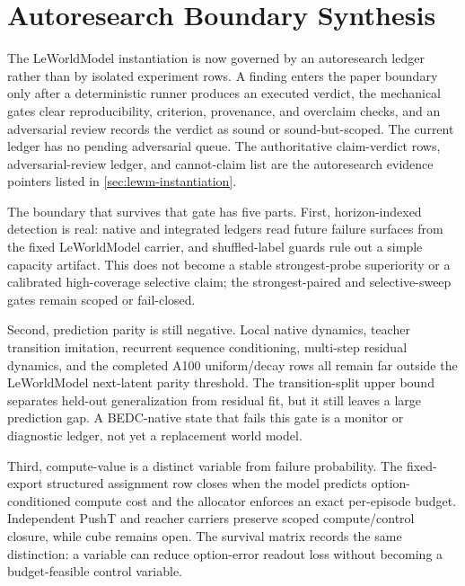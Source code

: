 \section{Autoresearch Boundary Synthesis}
\label{sec:autoresearch-boundary-synthesis}

The LeWorldModel instantiation is now governed by an autoresearch ledger rather
than by isolated experiment rows.  A finding enters the paper boundary only
after a deterministic runner produces an executed verdict, the mechanical gates
clear reproducibility, criterion, provenance, and overclaim checks, and an
adversarial review records the verdict as sound or sound-but-scoped.  The
current ledger has no pending adversarial queue.  The authoritative
claim-verdict rows, adversarial-review ledger, and cannot-claim list are the
autoresearch evidence pointers listed in \autoref{sec:lewm-instantiation}.

The boundary that survives that gate has five parts.  First, horizon-indexed
detection is real: native and integrated ledgers read future failure surfaces
from the fixed LeWorldModel carrier, and shuffled-label guards rule out a
simple capacity artifact.  This does not become a stable strongest-probe
superiority or a calibrated high-coverage selective claim; the strongest-paired
and selective-sweep gates remain scoped or fail-closed.

Second, prediction parity is still negative.  Local native dynamics, teacher
transition imitation, recurrent sequence conditioning, multi-step residual
dynamics, and the completed A100 uniform/decay rows all remain far outside the
LeWorldModel next-latent parity threshold.  The transition-split upper bound
separates held-out generalization from residual fit, but it still leaves a
large prediction gap.  A BEDC-native state that fails this gate is a monitor or
diagnostic ledger, not yet a replacement world model.

Third, compute-value is a distinct variable from failure probability.  The
fixed-export structured assignment row closes when the model predicts
option-conditioned compute cost and the allocator enforces an exact per-episode
budget.  Independent PushT and reacher carriers preserve scoped
compute/control closure, while cube remains open.  The survival matrix records
the same distinction: a variable can reduce option-error readout loss without
becoming a budget-feasible control variable.

